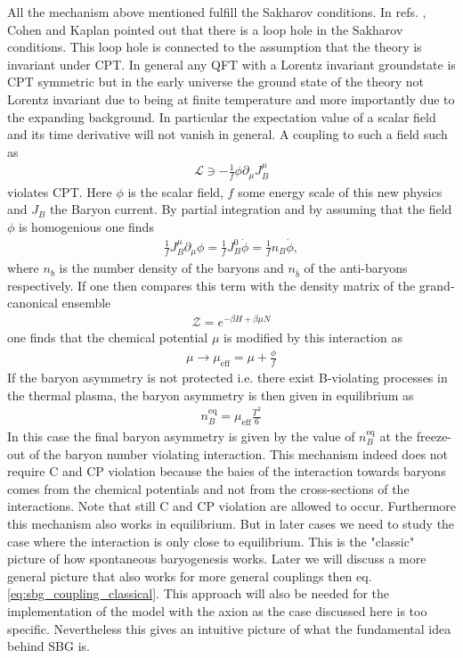 \documentclass[13pt,a4paper,twoside,titlepage]{article}
\begin{document}
All the mechanism above mentioned fulfill the Sakharov conditions.
In refs. \cite{COHEN1987251}, \cite{COHEN1988913} Cohen and Kaplan pointed out that there is a loop hole in the Sakharov conditions.
This loop hole is connected to the assumption that the theory is invariant under CPT.
In general any QFT with a Lorentz invariant groundstate is CPT symmetric but in the early universe the ground state of the theory not Lorentz invariant due to being at finite temperature and more importantly
due to the expanding background. In particular the expectation value of a scalar field and its time derivative will not vanish in general. A coupling to such a field such as \cite[eq. 1.2]{COHEN1987251}
\begin{align}
    \label{eq:sbg_coupling_classical}
    \mathcal{L} \ni - \frac{1}{f} \phi \partial_\mu J^\mu_B
\end{align}
violates CPT. Here $\phi$ is the scalar field, $f$ some energy scale of this new physics and $J_B$ the Baryon current.
By partial integration and by assuming that the field $\phi$ is homogenious one finds \cite[1.3]{COHEN1987251}
\begin{align}
    \frac{1}{f} J_B^\mu \partial_\mu \phi = \frac{1}{f} J_B^0 \dot{\phi}
    = \frac{1}{f} n_B \dot{\phi},
\end{align}
where $n_b$ is the number density of the baryons and $n_{\bar{b}}$ of the anti-baryons respectively.
If one then compares this term with the density matrix of the grand-canonical ensemble
\begin{align}
    \mathcal{Z} = e^{-\beta H + \beta \mu N}
\end{align}
one finds that the chemical potential $\mu$ is modified by this
interaction as
\begin{align}
    \mu \to \mu_\mathrm{eff} = \mu + \frac{\phi}{f}
\end{align}
If the baryon asymmetry is not protected i.e. there exist B-violating processes in the thermal plasma, the baryon asymmetry is then given in equilibrium as \cite[eq. 3.58]{the_early_universe_kolb_and_turner}
\begin{align}
    n_B^\mathrm{eq} = \mu_\mathrm{eff} \frac{T^2}{6}
\end{align}
In this case the final baryon asymmetry is given by the value of $n^\mathrm{eq}_B$ at the freeze-out of the baryon number violating interaction.
This mechanism indeed does not require C and CP violation because the baies of the interaction towards baryons comes from the chemical potentials and not from the cross-sections of the interactions.
Note that still C and CP violation are allowed to occur.
Furthermore this mechanism also works in equilibrium.
But in later cases we need to study the case where the interaction is only close to equilibrium.
This is the "classic" picture of how spontaneous baryogenesis works. Later we will discuss a more general picture
that also works for more general couplings then eq. \eqref{eq:sbg_coupling_classical}.
This approach will also be needed for the implementation of the model with the axion as the case discussed here is too
specific. Nevertheless this gives an intuitive picture of what the fundamental idea behind SBG is.
\end{document}
